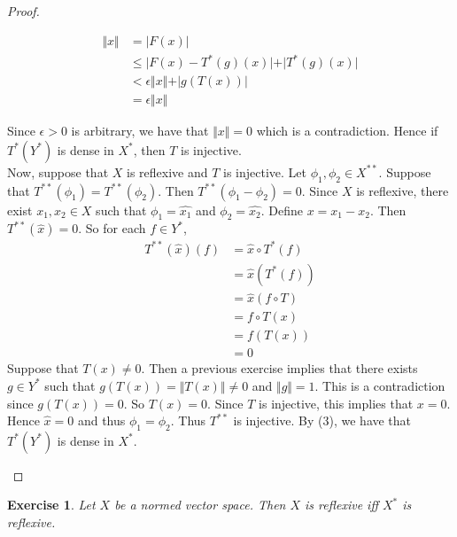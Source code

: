 \documentclass[12pt]{amsart}
\newtheorem{ex}[thm]{Exercise}
\newcommand{\ep}{\epsilon}
\newcommand{\n}{\Vert}
\begin{document}
\begin{proof}
\begin{enumerate}
\begin{align*}
\n x \n 
&= \vert F(x) \vert \\
&\leq \vert F(x) - T^*(g)(x) \vert + \vert T^*(g)(x) \vert \\
& < \ep \n x \n + \vert g(T(x)) \vert\\
&= \ep \n x \n
\end{align*}

Since $\ep > 0$ is arbitrary, we have that $\n x \n =0$ which is a contradiction. Hence if $T^*(Y^*) $ is dense in $X^*$, then $T$ is injective. \vspace{.5cm}\\ 
Now, suppose that $X$ is reflexive and $T$ is injective. Let $\phi_1, \phi_2 \in X^{**}$. Suppose that $T^{**}(\phi_1) = T^{**}(\phi_2)$. Then $T^{**}(\phi_1 - \phi_2) = 0$. Since $X$ is reflexive, there exist $x_1, x_2 \in X$ such that $\phi_1 = \hat{x_1}$ and $\phi_2 = \hat{x_2}$. Define $x = x_1 - x_2$. Then $T^{**}(\hat{x}) = 0$. So for each $f \in Y^*$, 
\begin{align*}
T^{**}(\hat{x})(f) 
&= \hat{x} \circ T^*(f)\\
&= \hat{x}( T^*(f))\\
&= \hat{x} (f \circ T)\\
&= f \circ T(x)\\
&= f(T(x))\\
&= 0 
\end{align*}
Suppose that $T(x) \neq 0$. Then a previous exercise implies that there exists $g \in Y^*$ such that $g(T(x)) = \n T(x) \n \neq 0$ and $\n g \n  = 1$. This is a contradiction since $g(T(x)) = 0$. So $T(x) = 0$. Since $T$ is injective, this implies that $x = 0$. Hence $\hat{x}=0$ and thus $\phi_1 = \phi_2$. Thus $T^{**}$ is injective. By (3), we have that $T^*(Y^*)$ is dense in $X^*$.
\end{enumerate}
\end{proof}

\begin{ex}
Let $X$ be a normed vector space. Then $X$ is reflexive iff $X^*$ is reflexive. 
\end{ex}
\end{document}
